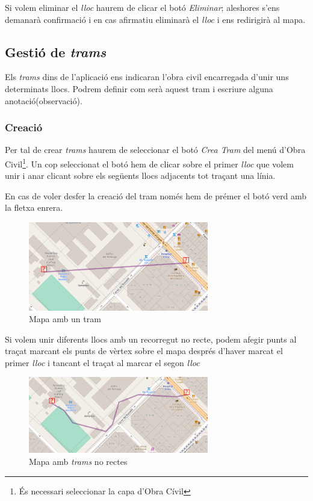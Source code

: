 \documentclass[a4paper]{article}
\begin{document}
	Si volem eliminar el \emph{lloc} haurem de clicar el botó \emph{Eliminar}; aleshores s'ens demanarà confirmació i en cas afirmatiu eliminarà el \emph{lloc} i ens redirigirà al mapa.
	
	\subsection{Gestió de \emph{trams}}
	Els \emph{trams} dins de l'aplicació ens indicaran l'obra civil encarregada d'unir uns determinats llocs. Podrem definir com serà aquest tram i escriure alguna anotació(observació).
	
	\subsubsection{Creació}
	Per tal de crear \emph{trams} haurem de seleccionar el botó \emph{Crea Tram} del menú d'Obra Civil\footnote{És necessari seleccionar la capa d'Obra Cívil}. Un cop seleccionat el botó hem de clicar sobre el primer \emph{lloc} que volem unir i anar clicant sobre els següents llocs adjacents tot traçant una línia.
	
	En cas de voler desfer la creació del tram només hem de prémer el botó verd amb la fletxa enrera.
	
	
	\begin{figure}[H]
		\centering
		\includegraphics[width=0.7\textwidth]{images/path_map_straight.png}
		\caption{Mapa amb un tram}
	\end{figure}
	
	Si volem unir diferents llocs amb un recorregut no recte, podem afegir punts al traçat marcant els punts de vèrtex sobre el mapa després d'haver marcat el primer \emph{lloc} i tancant el traçat al marcar el segon \emph{lloc}
	
	\begin{figure}[H]
		\centering
		\includegraphics[width=0.7\textwidth]{images/path_map_curve.png}
		\caption{Mapa amb \emph{trams} no rectes}
	\end{figure}
\end{document}
